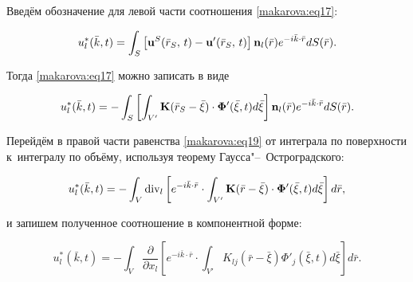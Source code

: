 Введём обозначение для левой части соотношения \eqref{makarova:eq17}:

\begin{equation}

\label{makarova:eq18}

u_l^\ast (\bar {k} , t)=\int_S \left[{\rm {\bf u}}^S(\bar {r}_S,\,t)-{\rm {\bf {u}'}}(\bar {r}_S,\,t)

\right] {\rm {\bf n}}_l (\bar {r})e^{-i \bar {k}\cdot \bar {r}}dS(\bar {r}).

\end{equation}

Тогда \eqref{makarova:eq17} можно записать в виде

\begin{equation}

\label{makarova:eq19}

u_l^\ast (\bar {k} , t)=-\int_S \left[\int_{V'} {\rm {\bf K}}(\bar {r}_S -\bar {\xi })

\cdot {\rm {\bf {\Phi}'}}(\bar {\xi} , t) d\bar {\xi }\right]{\rm {\bf n}}_l (\bar {r}) e^{-i \bar {k}\cdot \bar

{r}}dS(\bar {r}).

\end{equation}



Перейдём в правой части равенства \eqref{makarova:eq19} от интеграла по поверхности к~интегралу по объёму, используя теорему Гаусса"--~Остроградского:

\begin{equation}

\label{makarova:eq20}

u_l^\ast (\bar {k} , t)=-\int_V {\rm div}_l

\left[e^{-i\bar {k}\cdot \bar {r}} \cdot \int_{V'} {\rm {\bf K}}(\bar {r}-\bar {\xi })\cdot

{\rm {\bf {\Phi }'}}(\bar {\xi } , t) d\bar {\xi } \right] d\bar {r},

\end{equation}

и запишем полученное соотношение  в компонентной форме:

\begin{equation}

\label{makarova:eq21}

u_l^\ast (\bar {k} , t)=-\int_V

\frac{\partial}{\partial x_l} \left[ e^{-i \bar {k}\cdot \bar {r}} \cdot \int_{V'} K_{lj} (\bar {r}-\bar {\xi

}) \Phi'_j (\bar {\xi } , t)d\bar {\xi } \right]d\bar

{r}.

\end{equation}

